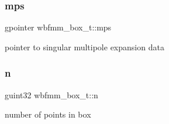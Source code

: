 \subsubsection{mps}
{\footnotesize\ttfamily gpointer wbfmm\+\_\+box\+\_\+t\+::mps}

pointer to singular multipole expansion data \mbox{\label{structwbfmm__box__t_a2b1e7872b6ada459d4f09465c3af8eca}} 
\subsubsection{n}
{\footnotesize\ttfamily guint32 wbfmm\+\_\+box\+\_\+t\+::n}

number of points in box 